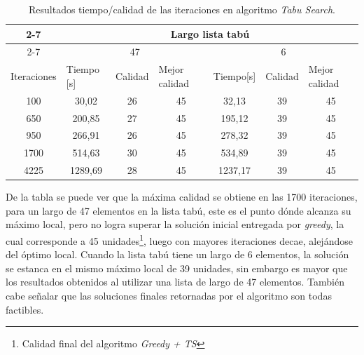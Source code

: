 \documentclass[letter, 10pt]{article}
\begin{document}
\begin{table}[t]
\begin{tabular}{c|c|c|c|c|c|c}
\cline{2-7}
\multicolumn{1}{l|}{{\ul }} & \multicolumn{6}{c|}{Largo lista tabú}                                    \\ \cline{2-7} 
\multicolumn{1}{l|}{}       & \multicolumn{3}{c|}{47}  & \multicolumn{3}{c|}{6}                        \\ \hline
\multicolumn{1}{|l|}{Iteraciones} &
  \multicolumn{1}{l|}{Tiempo {[}s{]}} &
  \multicolumn{1}{l|}{Calidad} &
  \multicolumn{1}{l|}{Mejor calidad} &
  \multicolumn{1}{l|}{Tiempo{[}s{]}} &
  \multicolumn{1}{l|}{Calidad} &
  \multicolumn{1}{l|}{Mejor calidad} \\ \hline
\multicolumn{1}{|c|}{100}   & 30,02   & 26 & 45 & 32,13   & 39 & \multicolumn{1}{c|}{45} \\ \hline
\multicolumn{1}{|c|}{650}   & 200,85  & 27 & 45 & 195,12  & 39 & \multicolumn{1}{c|}{45} \\ \hline
\multicolumn{1}{|c|}{950}   & 266,91  & 26 & 45 & 278,32  & 39 & \multicolumn{1}{c|}{45} \\ \hline
\multicolumn{1}{|c|}{1700}  & 514,63  & 30 & 45 & 534,89  & 39 & \multicolumn{1}{c|}{45} \\ \hline
\multicolumn{1}{|c|}{4225}  & 1289,69 & 28 & 45 & 1237,17 & 39 & \multicolumn{1}{c|}{45} \\ \hline
\end{tabular}
\caption{Resultados tiempo/calidad de las iteraciones en algoritmo \textit{Tabu Search}.}
\label{table:te}
\end{table}

\newpage
De la tabla se puede ver que la máxima calidad se obtiene en las 1700 iteraciones, para un largo de 47 elementos en la lista tabú, este es el punto dónde alcanza su máximo local, pero no logra superar la solución inicial entregada por \textit{greedy}, la cual corresponde a 45 unidades\footnote{Calidad final del algoritmo \textit{Greedy + TS}}, luego con mayores iteraciones decae, alejándose del óptimo local. Cuando la lista tabú tiene un largo de 6 elementos, la solución se estanca en el mismo máximo local de 39 unidades, sin embargo es mayor que los resultados obtenidos al utilizar una lista de largo de 47 elementos. También cabe señalar que las soluciones finales retornadas por el algoritmo son todas factibles.
\end{document}
